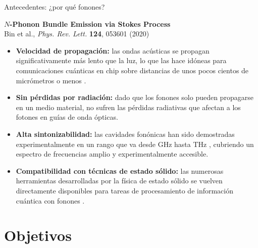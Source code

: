 \documentclass[
11pt,notheorems,hyperref={pdfauthor=whatever}
]{beamer}
\begin{document}
\begin{frame}{Antecedentes: ¿por qué fonones?}
	
	\textbf{$N$-Phonon Bundle Emission via Stokes Process}\\
	{\footnotesize Bin et al., \textit{Phys. Rev. Lett.} \textbf{124}, 053601 (2020) \cite{bin2020}}
	
	\vspace{12pt}
	
	{\small
		\begin{itemize}\setlength{\itemsep}{12pt}
			
			\item \textbf{Velocidad de propagación:} las ondas acústicas
			se propagan significativamente más lento que la luz,
			lo que las hace idóneas para comunicaciones cuánticas
			en chip sobre distancias de unos pocos cientos de
			micrómetros o menos \cite{gustafsson2014,kuzyk2018}.
			
			\item \textbf{Sin pérdidas por radiación:} dado que los
			fonones solo pueden propagarse en un medio material,
			no sufren las pérdidas radiativas que afectan a los
			fotones en guías de onda ópticas.
			
			\item \textbf{Alta sintonizabilidad:} las cavidades
			fonónicas han sido demostradas experimentalmente
			en un rango que va desde GHz hasta THz
			\cite{weig2004,rozas2009,oconnell2010,macCabe2020,zalalutdinov2021},
			cubriendo un espectro de frecuencias amplio y
			experimentalmente accesible.
			
			\item \textbf{Compatibilidad con técnicas de estado
				sólido:} las numerosas herramientas desarrolladas
			por la física de estado sólido
			\cite{ask2019,kharel2018,xu2018,akimov2017}
			se vuelven directamente disponibles para tareas
			de procesamiento de información cuántica con
			fonones \cite{manenti2017,wan2021}.
			
		\end{itemize}
	}
	
\end{frame}

\section{Objetivos}
\end{document}
